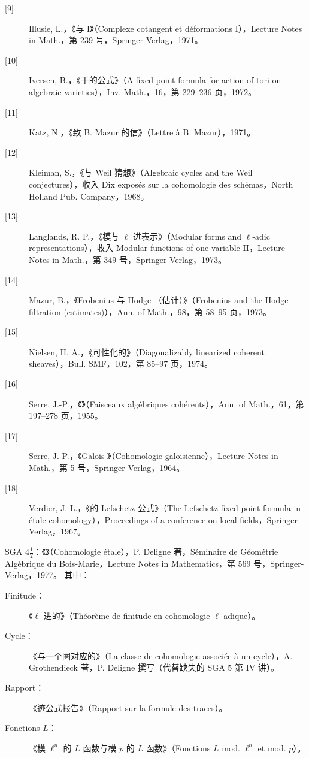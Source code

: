 \begin{description}
\item[{[9]}] Illusie, L.，《与 I》（Complexe cotangent et déformations I），Lecture Notes in Math.，第 239 号，Springer-Verlag，1971。
\item[{[10]}] Iversen, B.，《于的公式》（A fixed point formula for action of tori on algebraic varieties），Inv. Math.，16，第 229--236 页，1972。
\item[{[11]}] Katz, N.，《致 B. Mazur 的信》（Lettre à B. Mazur），1971。
\item[{[12]}] Kleiman, S.，《与 Weil 猜想》（Algebraic cycles and the Weil conjectures），收入 Dix exposés sur la cohomologie des schémas，North Holland Pub. Company，1968。
\item[{[13]}] Langlands, R. P.，《模与 $\ell$ 进表示》（Modular forms and $\ell$-adic representations），收入 Modular functions of one variable II，Lecture Notes in Math.，第 349 号，Springer-Verlag，1973。
\item[{[14]}] Mazur, B.，《Frobenius 与 Hodge （估计）》（Frobenius and the Hodge filtration (estimates)），Ann. of Math.，98，第 58--95 页，1973。
\item[{[15]}] Nielsen, H. A.，《可性化的》（Diagonalizably linearized coherent sheaves），Bull. SMF，102，第 85--97 页，1974。
\item[{[16]}] Serre, J.-P.，《》（Faisceaux algébriques cohérents），Ann. of Math.，61，第 197--278 页，1955。
\item[{[17]}] Serre, J.-P.，《Galois 》（Cohomologie galoisienne），Lecture Notes in Math.，第 5 号，Springer Verlag，1964。
\item[{[18]}] Verdier, J.-L.，《的 Lefschetz 公式》（The Lefschetz fixed point formula in étale cohomology），Proceedings of a conference on local fields，Springer-Verlag，1967。
\end{description}
SGA $4\frac12$：《》（Cohomologie étale），P. Deligne 著，Séminaire de Géométrie Algébrique du Bois-Marie，Lecture Notes in Mathematics，第 569 号，Springer-Verlag，1977。
其中：
\begin{description}
\item[Finitude：] 《$\ell$ 进的》（Théorème de finitude en cohomologie $\ell$-adique）。
\item[Cycle：] 《与一个圈对应的》（La classe de cohomologie associée à un cycle），A. Grothendieck 著，P. Deligne 撰写（代替缺失的 SGA 5 第 IV 讲）。
\item[Rapport：] 《迹公式报告》（Rapport sur la formule des traces）。
\item[Fonctions $L$：] 《模 $\ell^n$ 的 $L$ 函数与模 $p$ 的 $L$ 函数》（Fonctions $L$ mod. $\ell^n$ et mod. $p$）。
\end{description}
